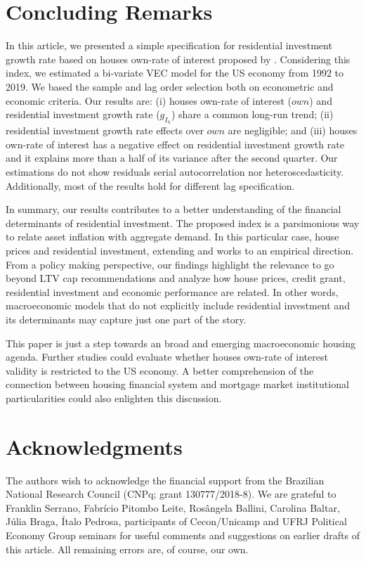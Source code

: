 \documentclass[12pt, a4paper]{article}
\begin{document}
\section{Concluding Remarks}
\label{sec:org3f12d7b}
\label{sec:Conclusion}
In this article, we presented a simple specification for residential investment growth rate based on houses own-rate of interest proposed by \textcite{teixeira_crescimento_2015}.
Considering this index, we estimated a bi-variate VEC model for the US economy from 1992 to 2019.
We based the sample and lag order selection both on econometric and economic criteria.
Our results are:
	(i) houses own-rate of interest (\(own\)) and residential investment growth rate (\(g_{I_h}\)) share a common long-run trend;
	(ii) residential investment growth rate effects over \(own\) are negligible; and
	(iii) houses own-rate of interest has a negative effect on residential investment growth rate and it explains more than a half of its variance after the second quarter.
Our estimations do not show residuals serial autocorrelation nor heteroscedasticity.
Additionally, most of the results hold for different lag specification.

In summary, our results contributes to a better understanding of the financial determinants of residential investment.
The proposed index is a parsimonious way to relate asset inflation with aggregate demand.
In this particular case, house prices and residential investment, extending \textcite{petrini_2021_TD} and \textcite{teixeira_crescimento_2015} works to an empirical direction.
From a policy making perspective, our findings highlight the relevance to go beyond LTV cap recommendations and analyze how house prices, credit grant, residential investment and economic performance are related.
In other words, macroeconomic models that do not explicitly include residential investment and its determinants may capture just one part of the story.

This paper is just a step towards an broad and emerging macroeconomic housing agenda.
Further studies could evaluate whether houses own-rate of interest validity is restricted to the US economy.
A better comprehension of the connection between housing financial system and mortgage market institutional particularities could also enlighten this discussion.


\section*{Acknowledgments}
\label{sec:orgf25ca55}
\noindent The authors wish to acknowledge the financial support from the Brazilian National Research Council (CNPq; grant 130777/2018-8). We are grateful to Franklin Serrano, Fabrício Pitombo Leite, Rosângela Ballini, Carolina Baltar, Júlia Braga, Ítalo Pedrosa, participants of Cecon/Unicamp and UFRJ Political Economy Group seminars for useful comments and suggestions on earlier drafts of this article. All remaining errors are, of course, our own.
\end{document}
